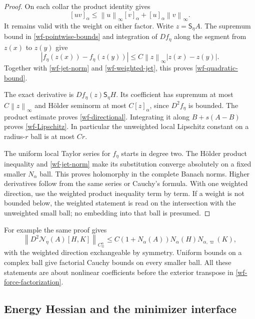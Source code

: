 \documentclass[11pt]{article}
\theoremstyle{remark}
\newcommand{\norm}[1]{\left\|#1\right\|}
\begin{document}
\begin{proof}
On each collar the product identity gives
\[
 [uv]_\alpha\le\norm{u}_\infty[v]_\alpha
                         +[u]_\alpha\norm{v}_\infty.
\]
It remains valid with the weight on either factor.
Write $z=\mathsf S_\eta A$. The supremum bound in
\eqref{wf-pointwise-bounds} and integration of $Df_\eta$
along the segment from $z(x)$ to $z(y)$ give
\[
 |f_\eta(z(x))-f_\eta(z(y))|
       \le C\norm{z}_\infty|z(x)-z(y)|.
\]
Together with \eqref{wf-jet-norm} and
\eqref{wf-weighted-jet}, this proves
\eqref{wf-quadratic-bound}.

The exact derivative is
$Df_\eta(z)\mathsf S_\eta H$. Its coefficient has supremum
at most $C\norm{z}_\infty$ and H\"older seminorm at most
$C[z]_\alpha$, since $D^2f_\eta$ is bounded. The product
estimate proves \eqref{wf-directional}. Integrating it
along $B+s(A-B)$ proves \eqref{wf-Lipschitz}. In particular
the unweighted local Lipschitz constant on a radius-$r$
ball is at most $Cr$.

The uniform local Taylor series for $f_\eta$ starts in
degree two. The H\"older product inequality and
\eqref{wf-jet-norm} make its substitution converge
absolutely on a fixed smaller $N_\alpha$ ball. This proves
holomorphy in the complete Banach norms. Higher derivatives
follow from the same series or Cauchy's formula. With one
weighted direction, use the weighted product inequality
term by term. If a weight is not bounded below, the weighted
statement is read on the intersection with the unweighted
small ball; no embedding into that ball is presumed.
\end{proof}

For example the same proof gives
\begin{equation}\label{wf-second-directional}
 \norm{D^2\mathcal N_\eta(A)[H,K]}_{C^\alpha_\varpi}
 \le C(1+N_\alpha(A))N_\alpha(H)N_{\alpha,\varpi}(K),
\end{equation}
with the weighted direction exchangeable by symmetry.
Uniform bounds on a complex ball give factorial Cauchy
bounds on every smaller ball. All these statements are
about nonlinear coefficients before the exterior
transpose in \eqref{wf-force-factorization}.

\subsection{Energy Hessian and the minimizer interface}
\end{document}
